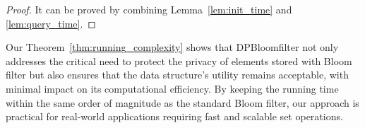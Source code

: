 \begin{proof}
It can be proved by combining Lemma~\ref{lem:init_time} and \ref{lem:query_time}. 
\end{proof}

Our Theorem~\ref{thm:running_complexity} shows that DPBloomfilter not only addresses the critical need to protect the privacy of elements stored with Bloom filter but also ensures that the data structure's utility remains acceptable, with minimal impact on its computational efficiency.
By keeping the running time within the same order of magnitude as the standard Bloom filter, our approach is practical for real-world applications requiring fast and scalable set operations. 

